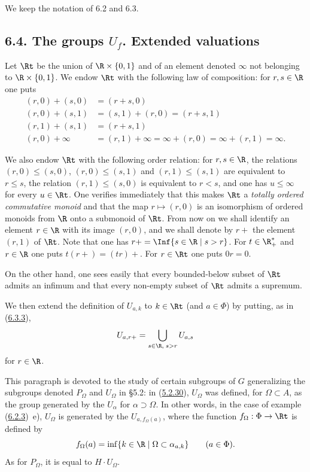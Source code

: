\documentclass[12pt,a4paper,oneside,english]{smfart}
\makeatletter
\newcommand{\btanchor}[1]{\leavevmode\Hy@raisedlink{\hypertarget{bt:#1}{}}}
\newcommand{\btref}[1]{\hyperlink{bt:#1}{#1}}
\newcommand{\btsecB}[2]{%
  \par\needspace{4\baselineskip}\phantomsection
  \subsection*{#2}%
  \ifx\relax#1\relax\else\btanchor{#1}\fi}
\theoremstyle{definition}
\theoremstyle{bt}
\makeatother
\begin{document}
\bigskip
{}
\medskip

We keep the notation of 6.2 and 6.3.


\btsecB{6.4}{6.4. The groups \texorpdfstring{$U_{f}$}{U\_f}. Extended valuations}
\btanchor{6.4.1}
Let $\Rt$ be the union of $\R\times\{0,1\}$ and of an element denoted
$\infty$ not belonging to $\R\times\{0,1\}$. We endow $\Rt$ with the
following law of composition: for $r,s\in\R$ one puts
\begin{align*}
  (r,0)+(s,0)&=(r+s,0)\\
  (r,0)+(s,1)&=(s,1)+(r,0)=(r+s,1)\\
  (r,1)+(s,1)&=(r+s,1)\\
  (r,0)+\infty&=(r,1)+\infty=\infty+(r,0)=\infty+(r,1)=\infty .
\end{align*}

We also endow $\Rt$ with the following order relation: for $r,s\in\R$, the
relations $(r,0)\leq(s,0)$, $(r,0)\leq(s,1)$ and $(r,1)\leq(s,1)$ are
equivalent to $r\leq s$, the relation $(r,1)\leq(s,0)$ is equivalent to
$r<s$, and one has $u\leq\infty$ for every $u\in\Rt$. One verifies
immediately that this makes $\Rt$ a \emph{totally ordered commutative
monoid} and that the map $r\mapsto(r,0)$ is an isomorphism of ordered
monoids from $\R$ onto a submonoid of $\Rt$. From now on we shall identify
an element $r\in\R$ with its image $(r,0)$, and we shall denote by $r+$ the
element $(r,1)$ of $\Rt$. Note that one has $r+=\Inf\{s\in\R\mid s>r\}$.
For $t\in\R^{*}_{+}$ and $r\in\R$ one puts $t(r+)=(tr)+$. For $r\in\Rt$ one
puts $0r=0$.

On the other hand, one sees easily that every bounded-below subset of $\Rt$
admits an infimum and that every non-empty subset of $\Rt$ admits a
supremum.

We then extend the definition of $U_{a,k}$ to $k\in\Rt$ (and $a\in\Phi$) by
putting, as in (\btref{6.3.3}),
\[
  U_{a,r+}=\bigcup_{s\in\R,\;s>r}U_{a,s}
\]
for $r\in\R$.

\btanchor{6.4.2}
This paragraph is devoted to the study of certain subgroups of $G$
generalizing the subgroups denoted $P_{\Omega}$ and $U_{\Omega}$ in \S5.2:
in (\btref{5.2.30}), $U_{\Omega}$ was defined, for $\Omega\subset A$, as the group
generated by the $U_{\alpha}$ for $\alpha\supset\Omega$. In other words, in
the case of example (\btref{6.2.3})~e), $U_{\Omega}$ is generated by the
$U_{a,f_{\Omega}(a)}$, where the function $f_{\Omega}:\Phi\to\Rt$ is defined
by
\begin{equation}
  f_{\Omega}(a)=\inf\{k\in\R\mid\Omega\subset\alpha_{a,k}\}\qquad(a\in\Phi).
\end{equation}
As for $P_{\Omega}$, it is equal to $H\cdot U_{\Omega}$.
\end{document}
